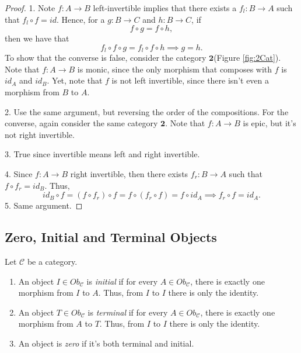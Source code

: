 \begin{proof}
1. Note $f:A \to B$ left-invertible implies that there exists a $f_l:B \to A$ such that
$f_l \circ f = id$. Hence, for a $g:B\to C$ and $h: B \to C$, if
\begin{displaymath}
  f \circ g = f \circ h,
\end{displaymath}
then we have that
\begin{displaymath}
  f_l \circ f \circ g = f_l \circ f \circ h \implies g =h.
\end{displaymath}
To show that the converse is false, consider the category $\mathbf{2}$(Figure \ref{fig:2Cat}). Note that
$f:A\to B$ is monic, since the only morphism that composes with $f$ is
$id_A$ and $id_B$. Yet, note that $f$ is not left invertible, since there isn't even
a morphism from $B$ to $A$.

2. Use the same argument, but reversing the order of the compositions.
For the converse, again consider the same category $\mathbf{2}$. Note that
$f:A\to B$ is epic, but it's not right invertible.

3. True since invertible means left and right invertible.

4. Since $f:A \to B$ right invertible, then there exists $f_r:B \to A$
such that $f \circ f_r = id_B$. Thus,
\begin{displaymath}
  id_B \circ f = (f \circ f_r) \circ f =
  f \circ (f_r \circ f) =
  f \circ id_A \implies f_r \circ f = id_A.
\end{displaymath}
5. Same argument.
\end{proof}

\subsection{Zero, Initial and Terminal Objects}

\begin{definition}
  Let $\mathcal C$ be a category.
  \begin{enumerate}[1.]
    \item An object $I \in Ob_\mathcal C$ is \textit{initial} if for every $A \in Ob_\mathcal C$,
      there is exactly one morphism from $I$ to $A$. Thus, from $I$ to $I$ there is only the identity.
    \item An object $T \in Ob_\mathcal C$ is \textit{terminal} if for every $A \in Ob_\mathcal C$,
      there is exactly one morphism from $A$ to $T$. Thus, from $I$ to $I$ there is only the identity.
    \item An object is \textit{zero} if it's both terminal and initial.
  \end{enumerate}
\end{definition}

